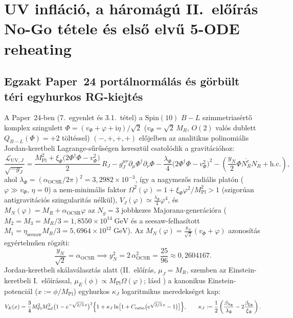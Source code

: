 \documentclass[11pt,a4paper]{article}
\begin{document}
\section{UV infláció, a háromágú II.~előírás No-Go tétele és első elvű 5-ODE reheating}
\label{sec:uv-inflation}

\subsection{Egzakt Paper~24 portálnormálás és görbült téri egyhurkos RG-kiejtés}
A Paper~24-ben \cite{Olcsak2026Paper24} (7.~egyenlet és 3.1.~tétel) a $\mathrm{Spin}(10)$ $B-L$ szimmetriasértő komplex szingulett $\Phi = (v_\Phi + \varphi + \mathrm{i}\eta)/\sqrt{2}$ ($v_\Phi = \sqrt{2}\,M_R$, $O(2)$ valós dublett $Q_{B-L}(\Phi) = +2$ töltéssel) $(-,+,+,+)$ előjelben az analitikus polinomiális Jordan-keretbeli Lagrange-sűrűségen keresztül csatolódik a gravitációhoz:
\begin{equation}
  \frac{\mathcal{L}_{\mathrm{UV},J}}{\sqrt{-g_J}} = \frac{M_{\mathrm{Pl}}^2 + \xi_\Phi\bigl(2\Phi^\dagger\Phi - v_\Phi^2\bigr)}{2}\,R_J - g_J^{\mu\nu}\partial_\mu\Phi^\dagger\partial_\nu\Phi - \frac{\lambda_\Phi}{4}\bigl(2\Phi^\dagger\Phi - v_\Phi^2\bigr)^2 - \left(\frac{y_N}{2}\Phi\overline{N_R^c}N_R + \mathrm{h.c.}\right),
  \label{eq:paper24-lagrangian}
\end{equation}
ahol $\lambda_\Phi = (\alpha_{\mathrm{OCSR}}/2\pi)^2 = 3{,}2982\times 10^{-3}$, így a nagymezős radiális platón ($\varphi \gg v_\Phi$, $\eta = 0$) a nem-minimális faktor $\Omega^2(\varphi) = 1 + \xi_\Phi\varphi^2/M_{\mathrm{Pl}}^2 > 1$ (szigorúan antigravitációs szingularitás nélkül), $V_J(\varphi) \simeq \frac{\lambda_\Phi}{4}\varphi^4$, és $M_N(\varphi) = M_R + \alpha_{\mathrm{OCSR}}\varphi$ az $N_g = 3$ jobbkezes Majorana-generációra ($M_2 = M_3 = M_R/3 = 1{,}8550\times 10^{14}\;\mathrm{GeV}$ és a seesaw-felhasított $M_1 = \eta_{\mathrm{seesaw}}M_R/3 = 5{,}6964\times 10^{12}\;\mathrm{GeV}$). Az $M_N(\varphi) = \frac{y_N}{\sqrt{2}}(v_\Phi + \varphi)$ azonosítás egyértelműen rögzíti:
\begin{equation}
  \frac{y_N}{\sqrt{2}} = \alpha_{\mathrm{OCSR}} \implies y_N^2 = 2\,\alpha_{\mathrm{OCSR}}^2 = \frac{25}{96} \approx 0{,}2604167.
  \label{eq:exact-yukawa-norm}
\end{equation}
Jordan-keretbeli skálaválasztás alatt (II.~előírás, $\mu_J = M_R$, szemben az Einstein-keretbeli I.~előírással, $\mu_E(\phi) \propto M_{\mathrm{Pl}}\Omega(\varphi)$; lásd \cite{BezrukovShaposhnikov2008,DeSimone2009}) a kanonikus Einstein-potenciál ($x := \phi/M_{\mathrm{Pl}}$) egyhurkos $\kappa_J$ logaritmikus meredekséget kap:
\begin{equation}
  V_E(x) = \frac{3}{4}M_{\mathrm{Pl}}^2 M_{\mathrm{inf}}^2\bigl(1 - e^{-\sqrt{2/3}\,x}\bigr)^2\Bigl\{1 + \kappa_J\ln\bigl[1 + C_{\mathrm{ratio}}\bigl(e^{\sqrt{2/3}\,x} - 1\bigr)\bigr]\Bigr\}, \qquad
  \kappa_J := \frac{1}{2}\left(\frac{\beta_{\lambda_\Phi}}{\lambda_\Phi} - 2\frac{\beta_{\xi_\Phi}}{\xi_\Phi}\right).
  \label{eq:ve-presc-ii}
\end{equation}
\end{document}
